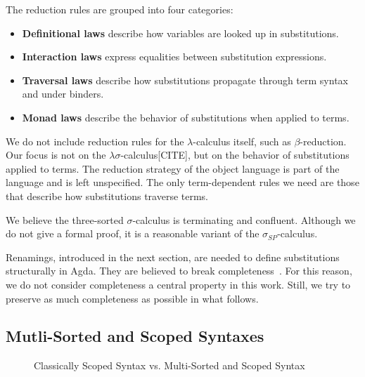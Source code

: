 \documentclass[screen,nonacm]{acmart}
\begin{document}
The reduction rules are grouped into four categories:
\begin{itemize}
      \item \textbf{Definitional laws} describe how variables are looked up in substitutions.
      \item \textbf{Interaction laws} express equalities between substitution expressions.
      \item \textbf{Traversal laws} describe how substitutions propagate through term syntax and under binders.
      \item \textbf{Monad laws} describe the behavior of substitutions when applied to terms.
\end{itemize}



We do not include reduction rules for the $\lambda$-calculus itself, such as
$\beta$-reduction. Our focus is not on the $\lambda\sigma$-calculus[CITE], but
on the behavior of substitutions applied to terms. The reduction strategy of
the object language is part of the language and is left unspecified. The only
term-dependent rules we need are those that describe how substitutions traverse
terms.

We believe the three-sorted $\sigma$-calculus is terminating and confluent.
Although we do not give a formal proof, it is a reasonable variant of the
$\sigma_{SP}$-calculus.

Renamings, introduced in the next section, are needed to define substitutions
structurally in Agda. They are believed to break completeness~\cite{CITE}. For
this reason, we do not consider completeness a central property in this work.
Still, we try to preserve as much completeness as possible in what follows.

\subsection{Mutli-Sorted and Scoped Syntaxes}\label{sec:pre-syn}
\begin{figure}[t]
      \centering
      \begin{minipage}[t]{0.48\linewidth}
            \raggedright{}
            \EScoped{}
      \end{minipage}
      \hfill
      \begin{minipage}[t]{0.48\linewidth}
            \raggedright{}
            \EMultiSorted{}
      \end{minipage}
      \caption{Classically Scoped Syntax vs. Multi-Sorted and Scoped Syntax}
      \label{fig:pre:svm}
\end{figure}
\end{document}
